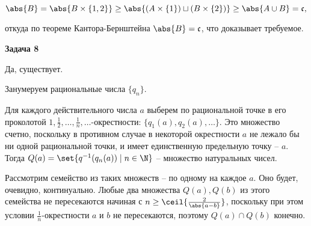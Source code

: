 		\begin{equation*}
			\abs{B} = \abs{B \times \{1, 2\}} \ge \abs{(A \times \{1\}) \sqcup (B \times \{2\})} \ge \abs{A \cup B} = \mathfrak{c},
		\end{equation*}

		откуда по теореме Кантора-Бернштейна $\abs{B} = \mathfrak{c}$, что доказывает требуемое.


	\begin{center}
    \textbf{Задача 8}
\end{center}
		Да, существует.

		Занумеруем рациональные числа $\{q_n\}$.

		Для каждого действительного числа $a$ выберем по рациональной точке в его проколотой $1, \frac{1}{2}, \dots, \frac{1}{n}, \dots$-окрестности: $\{q_1(a), q_2(a), \dots\}$. Это множество счетно, поскольку в противном случае в некоторой окрестности $a$ не лежало бы ни одной рациональной точки, и имеет единственную предельную точку -- $a$. Тогда $Q(a) = \set{q^{-1}(q_n(a)) \mid n \in \N}$ -- множество натуральных чисел.

		Рассмотрим семейство из таких множеств -- по одному на каждое $a$. Оно будет, очевидно, континуально. Любые два множества $Q(a), Q(b)$ из этого семейства не пересекаются начиная с $n \ge \ceil{\frac{2}{\abs{a-b}}}$, поскольку при этом условии $\frac{1}{n}$-окрестности $a$ и $b$ не пересекаются, поэтому $Q(a) \cap Q(b)$ конечно.



